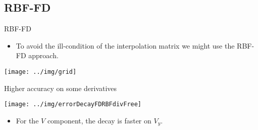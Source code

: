 \documentclass{beamer}
\begin{document}
\subsection{RBF-FD}
\begin{frame}{RBF-FD}
  \begin{itemize}
    \item To avoid the ill-condition of the interpolation matrix we might use
      the RBF-FD approach.
  \end{itemize}
  \begin{center}
    \texttt{[image: ../img/grid]}
  \end{center}
\end{frame}

\begin{frame}{Higher accuracy on some derivatives}
  \begin{center}
   \texttt{[image: ../img/errorDecayFDRBFdivFree]}
  \end{center}
  
  \begin{itemize}
    \item For the $V$ component, the decay is faster on $V_y$.
  \end{itemize}
\end{frame}
\end{document}
